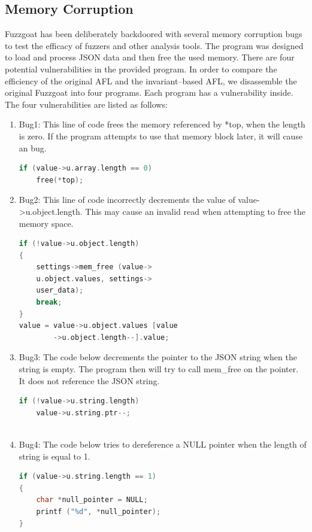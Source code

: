\documentclass[sigplan,10pt,review = false]{acmart}\settopmatter{printfolios=true,printccs=false,printacmref=false}
\begin{document}
\subsection{Memory Corruption}
Fuzzgoat has been deliberately backdoored with several memory corruption bugs to test the efficacy of fuzzers and other analysis tools. The program was designed to load and process JSON data and then free the used memory. There are four potential vulnerabilities in the provided program. In order to compare the efficiency of the original AFL and the invariant--based AFL, we disassemble the original Fuzzgoat into four programs. Each program has a vulnerability inside. 
The four vulnerabilities are listed as follows:
\begin{enumerate}
\item Bug1: This line of code frees the memory referenced by *top, when the length is zero. If the program attempts to use that memory block later, it will cause an bug.
\begin{lstlisting}[language=C]
if (value->u.array.length == 0) 
    free(*top);

\end{lstlisting}
\item Bug2: This line of code incorrectly decrements the value of value->u.object.length. This may cause an invalid read when attempting to free the memory space.
\begin{lstlisting}[language=C]
if (!value->u.object.length) 
{   
    settings->mem_free (value->
    u.object.values, settings->
    user_data);
    break;
}
value = value->u.object.values [value
        ->u.object.length--].value;
\end{lstlisting}
\item Bug3: The code below decrements the pointer to the JSON string when the string is empty. The program then will try to call mem\_free on the pointer. It does not reference the JSON string.
\begin{lstlisting}[language=C]
if (!value->u.string.length)
    value->u.string.ptr--;
            
\end{lstlisting}
\item Bug4: The code below tries to dereference a NULL pointer when the length of string is equal to 1.
\begin{lstlisting}[language=C]
if (value->u.string.length == 1) 
{     
    char *null_pointer = NULL;
    printf ("%d", *null_pointer);
}
\end{lstlisting}
\end{enumerate}
\end{document}
